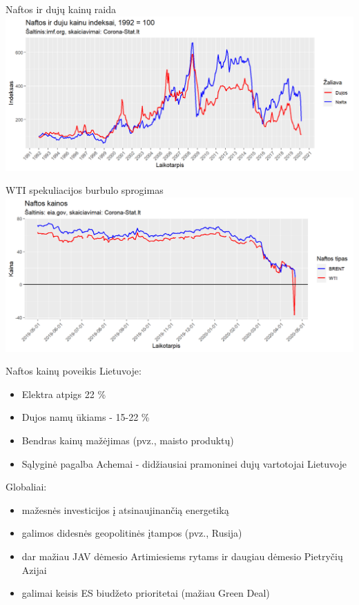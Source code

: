 \documentclass[aspectratio=169, 11pt]{beamer}
\begin{document}
\begin{frame}{Naftos ir dujų kainų raida}
\centering
\includegraphics[scale=0.65]{naftos_kainos_monthly.png}
\end{frame}

\begin{frame}{WTI spekuliacijos burbulo sprogimas}
\centering
\includegraphics[scale=0.65]{naftos_kainos_daily.png}
\end{frame}

\begin{frame}{Naftos kainų poveikis}
Lietuvoje:
\begin{itemize}
\item Elektra atpigs 22 \%
\item Dujos namų ūkiams - 15-22 \%
\item Bendras kainų mažėjimas (pvz., maisto produktų)
\item Sąlyginė pagalba Achemai - didžiausiai pramoninei dujų vartotojai Lietuvoje
\end{itemize}
Globaliai:
\begin{itemize}
\item mažesnės investicijos į atsinaujinančią energetiką
\item galimos didesnės geopolitinės įtampos (pvz., Rusija)
\item dar mažiau JAV dėmesio Artimiesiems rytams ir daugiau dėmesio Pietryčių Azijai
\item galimai keisis ES biudžeto prioritetai (mažiau Green Deal)
\end{itemize}
\end{frame}
\end{document}
